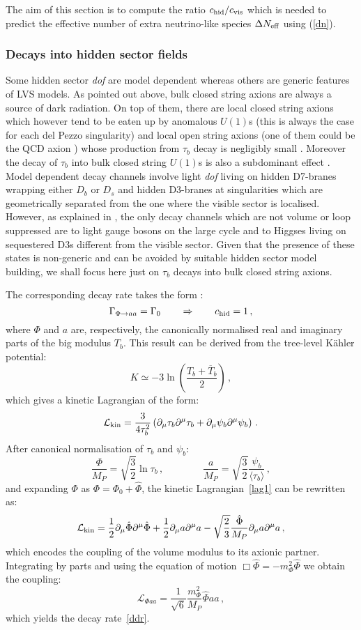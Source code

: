 \documentclass[11pt,a4paper]{article}
\newcommand{\be}{\begin{equation}}
\newcommand{\ee}{\end{equation}}
\newcommand{\mc}{\mathcal}
\begin{document}
The aim of this section is to compute the ratio $c_{\rm hid}/c_{\rm vis}$ which is needed to predict the effective number of extra neutrino-like species $\Delta N_{\rm eff}$ using (\ref{dn}).

\subsubsection{Decays into hidden sector fields}
\label{vmds}

Some hidden sector \textit{dof} are model dependent whereas others are generic features of LVS models. As pointed out above, bulk closed string axions are always a source of dark radiation. On top of them, there are local closed string axions which however tend to be eaten up by anomalous $U(1)$s (this is always the case for each del Pezzo singularity) and local open string axions (one of them could be the QCD axion \cite{CYembedding}) whose production from $\tau_b$ decay is negligibly small \cite{DR1}. Moreover the decay of $\tau_b$ into bulk closed string $U(1)$s is also a subdominant effect \cite{DR1}. Model dependent decay channels involve light \textit{dof} living on hidden D7-branes wrapping either $D_b$ or $D_s$ and hidden D3-branes at singularities which are geometrically separated from the one where the visible sector is localised. However, as explained in \cite{DR1}, the only decay channels which are not volume or loop suppressed are to light gauge bosons on the large cycle and to Higgses living on sequestered D3s different from the visible sector. Given that the presence of these states is non-generic and can be avoided by suitable hidden sector model building, we shall focus here just on $\tau_b$ decays into 
bulk closed string axions. 

The corresponding decay rate takes the form \cite{DR1,DR2}: 
\be
\Gamma_{\Phi \rightarrow a a} = \Gamma_0\qquad\Rightarrow\qquad c_{\rm hid}=1\,,
\label{ddr}
\ee
where $\Phi$ and $a$ are, respectively, the canonically normalised real and imaginary parts of the big modulus $T_b$.
This result can be derived from the tree-level K\"ahler potential:
\be
K \simeq - 3 \ln\left(\frac{T_b+\overline{T}_b}{2}\right)\,,
\ee
which gives a kinetic Lagrangian of the form:
\be
\mc{L}_{\rm kin} = \frac{3}{4 \tau_b^2} \left(\partial_\mu \tau_b \partial^\mu \tau_b + \partial_\mu \psi_b \partial^\mu \psi_b\right)\,.
\label{lag1}
\ee
After canonical normalisation of $\tau_b$ and $\psi_b$:
\be
\label{cn1}
\frac{\Phi}{M_P} = \sqrt{\frac{3}{2}} \ln \tau_b\,, \qquad \qquad \frac{a}{M_P} = \sqrt{\frac{3}{2}} \frac{\psi_b}{\langle \tau_b \rangle}\,,
\ee
and expanding $\Phi$ as $\Phi = \Phi_0 + \hat \Phi$, the kinetic Lagrangian~\eqref{lag1} can be rewritten as:
\be
\mc{L}_{\rm kin} = \frac 12 \partial_\mu \hat\Phi \partial^\mu \hat\Phi + \frac 12 \partial_\mu a \partial^\mu a 
- \sqrt{\frac 23 } \frac{\hat \Phi}{M_P} \partial_\mu a \partial^\mu a\,,
\ee
which encodes the coupling of the volume modulus to its axionic partner. Integrating by parts and using the equation of motion 
$\Box \hat \Phi = - m_\Phi^2 \hat \Phi$ we obtain the coupling:
\be
\mathcal{L}_{\Phi a a} = \frac{1}{\sqrt{6}}\frac{m_\Phi^2}{M_P} \hat\Phi a a\,,
\label{lphiaa}
\ee
which yields the decay rate~\eqref{ddr}.
\end{document}
